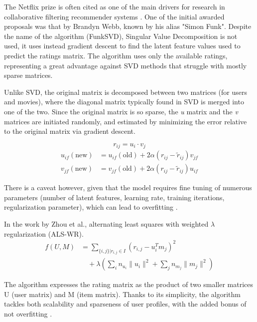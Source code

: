 \documentclass[conference]{IEEEtran}
\begin{document}
The Netflix prize is often cited as one of the main drivers for research in collaborative filtering recommender systems \cite{netflix_prize_2009}. One of the initial awarded proposals was that by Brandyn Webb, known by his alias "Simon Funk". Despite the name of the algorithm (FunkSVD), Singular Value Decomposition is not used, it uses instead gradient descent to find the latent feature values used to predict the ratings matrix. The algorithm uses only the available ratings, representing a great advantage against SVD methods that struggle with mostly sparse matrices. 

Unlike SVD, the original matrix is decomposed between two matrices (for users and movies), where the diagonal matrix typically found in SVD is merged into one of the two. Since the original matrix is so sparse, the \textit{u} matrix and the \textit{v} matrices are initiated randomly, and estimated by minimizing the error relative to the original matrix via gradient descent.

\begin{equation}
r_{ij} = u_i \cdot v_j
\end{equation}
\begin{align}
u_{if}(\text{new}) &= u_{if}(\text{old}) + 2\alpha(r_{ij} - \tilde{r}_{ij})v_{jf} \\
v_{jf}(\text{new}) &= v_{jf}(\text{old}) + 2\alpha(r_{ij} - \tilde{r}_{ij})u_{if}
\end{align}

There is a caveat however, given that the model requires fine tuning of numerous parameters (number of latent features, learning rate, training iterations, regularization parameter), which can lead to overfitting \cite{Funk2006}. 

In the work by Zhou et al., alternating least squares with weighted  $\lambda$ regularization (ALS-WR). 
\begin{align}
f(U, M) &= \sum_{\{i, j\} | r_{i,j} \in I} \left( r_{i,j} - u_i^T m_j \right)^2 \nonumber \\
&\quad + \lambda \left( \sum_i n_{u_i} \| u_i \|^2 + \sum_j n_{m_j} \| m_j \|^2 \right)
\end{align}

The algorithm expresses the rating matrix as the product of two smaller matrices U (user matrix) and M (item matrix). Thanks to its simplicity, the algorithm tackles both scalability and sparseness of user profiles, with the added bonus of not overfitting \cite{10.1007/978-3-540-68880-8_32}. 
\end{document}
